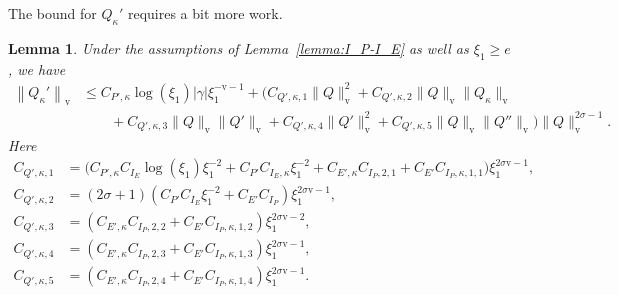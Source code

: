 \documentclass[11pt]{article}
\newcommand{\normv}{\mathrm{v}}
\newtheorem{lemma}[definition]{Lemma}
\begin{document}
The bound for \(Q_{\kappa}'\) requires a bit more work.
\begin{lemma}\label{lemma:norm-Q-dkappa-dxi}
  Under the assumptions of Lemma~\ref{lemma:I_P-I_E} as well as
  \(\xi_1 \geq e\), we have
  \begin{align*}
    \left\|Q_{\kappa}'\right\|_{\normv}
    &\leq C_{P',\kappa}\log(\xi_{1})|\gamma|\xi_{1}^{-\normv - 1}
      + \Bigg(
      C_{Q',\kappa,1}\|Q\|_{\normv}^{2}
      + C_{Q',\kappa,2}\|Q\|_{\normv}\|Q_{\kappa}\|_{\normv}\\
    &\qquad+ C_{Q',\kappa,3}\|Q\|_{\normv}\|Q'\|_{\normv}
      + C_{Q',\kappa,4}\|Q'\|_{\normv}^{2}
      + C_{Q',\kappa,5}\|Q\|_{\normv}\|Q''\|_{\normv}
      \Bigg)\|Q\|_{\normv}^{2\sigma - 1}.
  \end{align*}
  Here
  \begin{align*}
    C_{Q',\kappa,1}
    &= \Big(
      C_{P',\kappa}C_{I_{E}}\log(\xi_{1})\xi_{1}^{-2}
      + C_{P'}C_{I_{E},\kappa}\xi_{1}^{-2}
      + C_{E',\kappa}C_{I_{P},2,1}
      + C_{E'}C_{I_{P},\kappa,1,1}
      \Big)\xi_{1}^{2\sigma\normv - 1},\\
    C_{Q',\kappa,2}
    &=
      (2\sigma + 1)(
      C_{P'}C_{I_{E}}\xi_{1}^{-2}
      + C_{E'}C_{I_{P}})\xi_{1}^{2\sigma\normv - 1},\\
    C_{Q',\kappa,3}
    &=
      (
      C_{E',\kappa}C_{I_{P},2,2}
      + C_{E'}C_{I_{P},\kappa,1,2}
      )\xi_{1}^{2\sigma\normv - 2},\\
    C_{Q',\kappa,4}
    &=
      (
      C_{E',\kappa}C_{I_{P},2,3}
      + C_{E'}C_{I_{P},\kappa,1,3}
      )\xi_{1}^{2\sigma\normv - 1},\\
    C_{Q',\kappa,5}
    &=
      (
      C_{E',\kappa}C_{I_{P},2,4}
      + C_{E'}C_{I_{P},\kappa,1,4}
      )\xi_{1}^{2\sigma\normv - 1}.
  \end{align*}
\end{lemma}
\end{document}
